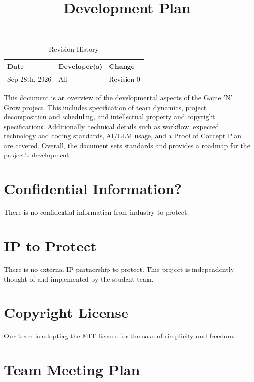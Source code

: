 \documentclass{article}
\title{Development Plan\\\progname}
\author{\authname}
\date{}
\begin{document}
\maketitle

\begin{table}[hp]
\caption{Revision History} \label{TblRevisionHistory}
\begin{tabularx}{\textwidth}{llX}
\toprule
\textbf{Date} & \textbf{Developer(s)} & \textbf{Change}\\
\midrule
Sep 28th, 2026 & All & Revision 0\\
\bottomrule
\end{tabularx}
\end{table}

\newpage{}

\noindent This document is an overview of the developmental aspects of the \href{https://github.com/meena-alomran/game-n-grow}
{Game 'N' Grow} project. This includes specification of team dynamics, project decomposition and scheduling, and intellectual
property and copyright specifications. Additionally, technical details such as workflow, expected technology and coding standards,
AI/LLM usage, and a Proof of Concept Plan are covered. Overall, the document sets standards and provides a roadmap for the project's development.

\section{Confidential Information?}

There is no confidential information from industry to protect.
\section{IP to Protect}

There is no external IP partnership to protect. This project is independently thought of and implemented by the student team.

\section{Copyright License}

Our team is adopting the MIT license for the sake of simplicity and freedom.

\section{Team Meeting Plan}
\end{document}
